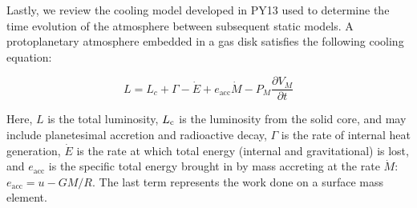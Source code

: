 \documentclass[apj]{emulateapj}
\begin{document}



Lastly, we review the cooling model developed in PY13 used to determine the time evolution of the atmosphere between subsequent static models. A protoplanetary atmosphere embedded in a gas disk satisfies the following cooling equation:

\begin{equation}
\label{eq:coolingglobal}
L=L_c+\Gamma-\dot{E}+e_{\mathrm{acc}}\dot{M}-P_M \frac{\partial V_M}{\partial t}
\end{equation}

Here, $L$ is the total luminosity, $L_{\rm c}$ is the luminosity from the solid core, and may include planetesimal accretion and radioactive decay, $\Gamma$ is the rate of internal heat generation, $\dot{E}$ is the rate at which total energy (internal and gravitational) is lost, and  $e_{\mathrm{acc}}$ is the specific total energy brought in by mass accreting at the rate $\dot{M}$: $e_{\mathrm{acc}}=u-G M/R$. The last term represents the work done on a surface mass element. 


\end{document}
